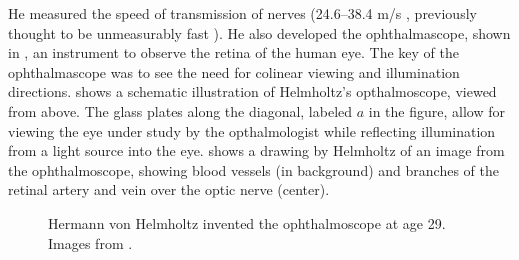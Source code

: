 He measured the speed of transmission of nerves (24.6--38.4 m/s \cite{wikiHelmholtz2021}, previously thought to be unmeasurably fast \cite{Shapin2019}).  He also developed the ophthalmascope, shown in \fig{\ref{fig:helmholtz}}, an instrument to observe the retina of the human eye. The key of the ophthalmascope was to see the need for colinear viewing and illumination directions.  shows a schematic illustration of Helmholtz's opthalmoscope, viewed from above.  The glass plates along the diagonal, labeled $a$ in the figure, allow for viewing the eye under study by the opthalmologist while reflecting illumination from a light source into the eye.  shows a drawing by Helmholtz of an image from the ophthalmoscope, showing blood vessels (in background) and branches of the retinal artery and vein over the optic nerve (center). 


\begin{figure}[t]
\centerline{
} 
\caption{Hermann von Helmholtz invented the ophthalmoscope at age 29.  
Images from \cite{Helmholtz1925}.}
\label{fig:helmholtz}
\end{figure}


